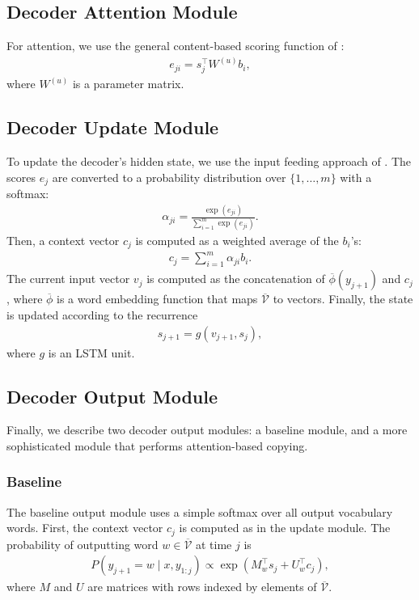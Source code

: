 \documentclass[11pt,letterpaper]{article}
\newcommand{\vocabout}{\overline{\mathcal{V}}}
\newcommand{\phiout}{\overline{\phi}}
\begin{document}
\subsection{Decoder Attention Module}
For attention, we use the general content-based scoring function of
:
\begin{align}
  e_{ji} = s_j^\top W^{(u)} b_i,
\end{align}
where $W^{(u)}$ is a parameter matrix.

\subsection{Decoder Update Module}
To update the decoder's hidden state,
we use the input feeding approach of .
The scores $e_j$ are converted to a probability distribution 
over $\{1, \dotsc, m\}$ with a softmax:
\begin{align}
  \alpha_{ji} = \frac{\exp(e_{ji})}{\sum_{i=1}^m \exp(e_{ji})}.
\end{align}
Then, a context vector $c_j$ is computed as a weighted average of the $b_i$'s:
\begin{align}
  c_j = \sum_{i=1}^m \alpha_{ji} b_i.
\end{align}
The current input vector $v_j$ is computed as 
the concatenation of $\phiout(y_{j+1})$ and $c_{j}$,
where $\phiout$ is a word embedding function that maps $\vocabout$ to vectors.
Finally, the state is updated according to the recurrence
\begin{align}
  s_{j+1} = g(v_{j+1}, s_{j}),
\end{align}
where $g$ is an LSTM unit.

\subsection{Decoder Output Module}
Finally, we describe two decoder output modules: a baseline module, and a
more sophisticated module that performs attention-based copying.

\subsubsection{Baseline}
\label{sec:baseline-output}
The baseline output module uses a simple softmax over all
output vocabulary words.
First, the context vector $c_j$ is computed as in the update module.
The probability of outputting word $w \in \vocabout$ at time $j$ is
\begin{align}
  P(y_{j+1} = w \mid x, y_{1:j}) \propto \exp(M_{w}^\top s_j + U_w^\top c_j),
\end{align}
where $M$ and $U$ are matrices with rows indexed by elements of $\vocabout$.
\end{document}
